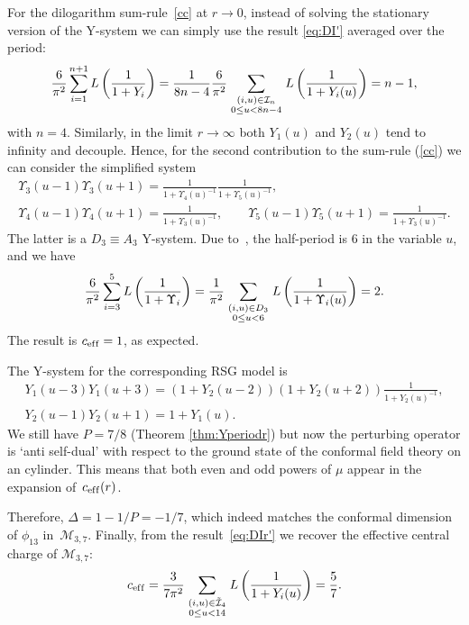 \documentclass[pdftex]{sigma}
\numberwithin{equation}{section}
\theoremstyle{definition}
\begin{document}
For the dilogarithm sum-rule~\eqref{cc}
 at $r \rightarrow 0$, instead of solving the stationary version of the Y-system
we can simply use  the result \eqref{eq:DI'} averaged over the period:
\[
\frac{6}{\pi^2 } \sum_{i=1}^{n+1}  L\left( \frac{1}{ 1+ Y_i}\right) = \frac{1}{ 8n-4}  \frac{6}{\pi^2 }  \sum_{
\genfrac{}{}{0pt}{1}
{
(i,u)\in \mathcal{I}_{n}
}
{
0\leq u < 8n-4
}
} L\left( \frac{1}{1+ Y_i(u)} \right) =n-1,
\]
with $n=4$.
Similarly, in the limit $r \rightarrow \infty$ both   $Y_1(u)$ and $Y_2(u)$ tend to inf\/inity and decouple. Hence,  for the second
contribution to the sum-rule
(\ref{cc}) we can consider  the simplif\/ied system
\begin{gather*}
\Upsilon_3(u-1) \Upsilon_3(u+1)  = \frac{1}{1+\Upsilon_4(u)^{-1}} \frac{1}{1+\Upsilon_5(u)^{-1}},  \nonumber \\
\Upsilon_4(u-1) \Upsilon_4(u+1)  = \frac{1}{1+\Upsilon_3(u)^{-1}},  \qquad
\Upsilon_5(u-1) \Upsilon_5(u+1)  = \frac{1}{1+\Upsilon_3(u)^{-1}}.%
\end{gather*}
The latter  is a $D_3\equiv A_3$ Y-system.
Due to~\cite{Gliozzi95},  the half-period is  $6$
in the variable $u$,  and we have
\[
\frac{6}{\pi^2 } \sum_{i=3}^{5}  L\left( \frac{1}{1+ \Upsilon_i}\right) = \frac{1}{\pi^2 }
\sum_{
\genfrac{}{}{0pt}{1}
{
(i,u)\in D_{3}
}
{
0\leq u < 6
}
} L\left( \frac{1}{1+ \Upsilon_i(u)} \right) = 2.
\]
The result is  $c_{\rm  ef\/f}= 1$, as expected.

The Y-system for the  corresponding RSG model is
\begin{gather*}
Y_1(u-3) Y_1(u+3)
 =
( 1+ Y_2(u-2)) ( 1+ Y_2(u+2)) \frac{1}{1+Y_2(u)^{-1}},  \nonumber\\
Y_2(u-1) Y_2(u+1)
 = 1+ Y_1(u).%
\end{gather*}
We still have $P=7/8$ (Theorem \ref{thm:Yperiodr})
 but now  the perturbing operator is `anti self-dual' with respect
 to the  ground state of the conformal f\/ield theory on  an cylinder.
 This means that both even and odd powers of $\mu$ appear in the expansion of~$c_{\rm ef\/f}(r)$.

Therefore,
$\Delta=1 - 1/P= -1/7$, which indeed matches the conformal dimension of  $\phi_{13}$  in~$\mathcal{M}_{3,7}$.
Finally, from  the result~\eqref{eq:DIr'}
we recover the ef\/fective central charge of $\mathcal{M}_{3,7}$:
\[
c_{\rm ef\/f}=   \frac{3}{7 \pi^2}
\sum_{
\genfrac{}{}{0pt}{1}
{
(i,u)\in \tilde{\mathcal{I}}_{4}
}
{
0\leq u < 14
}
}
L\left( \frac{1}{1+ Y_i(u)} \right) = \frac{5}{7}.
\]
\end{document}

